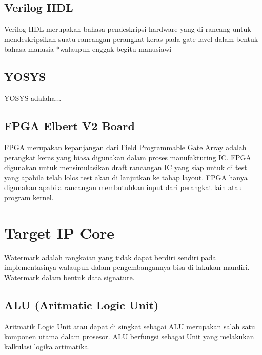 \subsection{Verilog HDL}
Verilog HDL merupakan bahasa pendeskripsi hardware yang di rancang untuk mendeskripsikan suatu rancangan perangkat keras pada gate-lavel dalam bentuk bahasa manusia *walaupun enggak begitu manusiawi

\subsection{YOSYS}
YOSYS adalaha...

\subsection{FPGA Elbert V2 Board}
FPGA merupakan kepanjangan dari Field Programmable Gate Array adalah perangkat keras yang biasa digunakan dalam proses manufakturing IC. FPGA digunakan untuk mensimulasikan draft rancangan IC yang siap untuk di test yang apabila telah lolos test akan di lanjutkan ke tahap layout. FPGA hanya digunakan apabila rancangan membutuhkan input dari perangkat lain atau program kernel.

\section{Target IP Core}
Watermark adalah rangkaian yang tidak dapat berdiri sendiri pada implementasinya walaupun dalam pengembangannya bisa di lakukan mandiri. Watermark dalam bentuk data signature.

\subsection{ALU (Aritmatic Logic Unit)}
Aritmatik Logic Unit atau dapat di singkat sebagai ALU merupakan salah satu komponen utama dalam prosesor. ALU berfungsi sebagai Unit yang melakukan kalkulasi logika artimatika.
